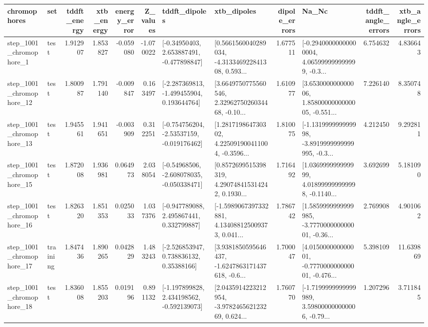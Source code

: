\begin{tabular}{llrrrrllrlrr}
\toprule
             chromophores &       set &  tddft\_energy &  xtb\_energy &  energy\_error &  Z\_values &                               tddft\_dipoles &                                        xtb\_dipoles &  dipole\_errors &                                              Na\_Nc &  tddft\_angle\_errors &  xtb\_angle\_errors \\
\midrule
  step\_1001\_chromophore\_1 &      test &      1.912907 &    1.853827 &     -0.059080 & -1.070022 &    [-0.34950403, 2.653887491, -0.477898847] &  [0.5661560040289034, -4.313346922841308, 0.593... &       1.677511 &  [-0.29400000000000004, 4.065999999999999, -0.3... &            6.754632 &          4.836643 \\
 step\_1001\_chromophore\_12 &      test &      1.800987 &    1.791140 &     -0.009847 &  0.163497 &   [-2.287369813, -1.499455904, 0.193644764] &  [3.6649750775560546, 2.3296275026034468, -0.10... &       1.610977 &  [3.653000000000006, 1.8580000000000005, -0.551... &            7.226140 &          8.350748 \\
 step\_1001\_chromophore\_13 &      test &      1.945561 &    1.941651 &     -0.003909 &  0.312251 &   [-0.754756204, -2.53537159, -0.019176462] &  [1.281719864730302, 4.225091900411004, -0.3596... &       1.810075 &  [-1.131999999999998, -3.8919999999999995, -0.3... &            4.212450 &          9.292811 \\
 step\_1001\_chromophore\_15 &      test &      1.872008 &    1.936981 &      0.064973 &  2.038054 &   [-0.54968506, -2.608078035, -0.050338471] &  [0.8572699515398319, 4.290748415314242, 0.1930... &       1.716492 &  [1.036999999999999, 4.018999999999998, -0.1140... &            3.692699 &          5.181090 \\
 step\_1001\_chromophore\_16 &      test &      1.826320 &    1.851353 &      0.025033 &  1.037376 &    [-0.947789088, 2.495867441, 0.332799887] &  [-1.5989067397332881, 4.134088125009373, 0.041... &       1.786742 &  [1.5859999999999985, -3.777000000000001, -0.36... &            2.769908 &          4.901062 \\
 step\_1001\_chromophore\_17 &  training &      1.847436 &    1.890265 &      0.042829 &  1.483243 &     [-2.526853947, 0.738836132, 0.35388166] &  [3.9381850595646437, -1.6247863171437618, -0.6... &       1.700047 &  [4.015000000000001, -0.777000000000001, -0.476... &            5.398109 &         11.639869 \\
 step\_1001\_chromophore\_18 &      test &      1.836008 &    1.855203 &      0.019196 &  0.891132 &   [-1.197899828, 2.434198562, -0.592139073] &  [2.0435914223212954, -3.978246562123269, 0.624... &       1.760770 &  [-1.7199999999999989, 3.598000000000006, -0.79... &            1.207296 &          3.711845 \\

\end{tabular}
